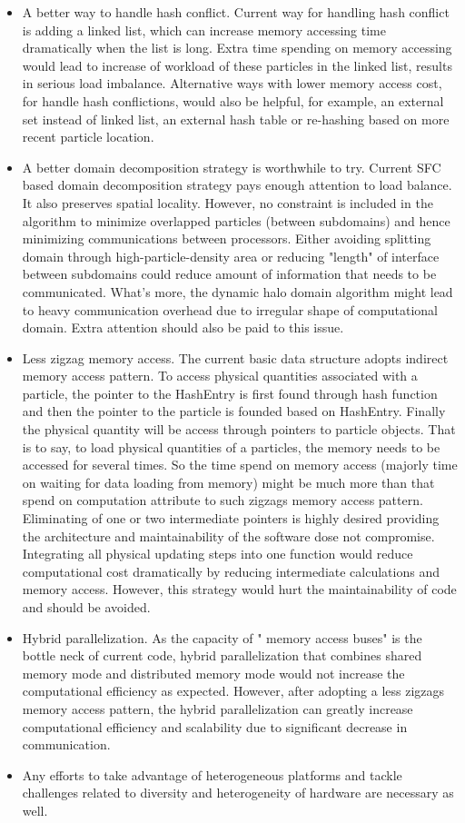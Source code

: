 \begin{itemize}
\item A better way to handle hash conflict. Current way for handling hash conflict is adding a linked list, which can increase memory accessing time dramatically when the list is long. Extra time spending on memory accessing would lead to increase of workload of these particles in the linked list, results in serious load imbalance. Alternative ways with lower memory access cost, for handle hash conflictions, would also be helpful, for example, an external set instead of linked list, an external hash table or re-hashing based on more recent particle location.
\item A better domain decomposition strategy is worthwhile to try. Current SFC based domain decomposition strategy pays enough attention to load balance. It also preserves spatial locality. However, no constraint is included in the algorithm to minimize overlapped particles (between subdomains) and hence minimizing communications between processors. Either avoiding splitting domain through high-particle-density area or reducing "length" of interface between subdomains could reduce amount of information that needs to be communicated. What's more, the dynamic halo domain algorithm might lead to heavy communication overhead due to irregular shape of computational domain. Extra attention should also be paid to this issue.
\item Less zigzag memory access. The current basic data structure adopts indirect memory access pattern. To access physical quantities associated with a particle, the pointer to the HashEntry is first found through hash function and then the pointer to the particle is founded based on HashEntry. Finally the physical quantity will be access through pointers to particle objects. That is to say, to load physical quantities of a particles, the memory needs to be accessed for several times.
So the time spend on memory access (majorly time on waiting for data loading from memory) might be much more than that spend on computation attribute to such zigzags memory access pattern. Eliminating of one or two intermediate pointers is highly desired providing the architecture and maintainability of the software dose not compromise. Integrating all physical updating steps into one function would reduce computational cost dramatically by reducing intermediate calculations and memory access. However, this strategy would hurt the maintainability of code and should be avoided.
\item Hybrid parallelization. As the capacity of " memory access buses" is the bottle neck of current code, hybrid parallelization that combines shared memory mode and distributed memory mode would not increase the computational efficiency as expected. However, after adopting a less zigzags memory access pattern, the hybrid parallelization can greatly increase computational efficiency and scalability due to significant decrease in communication.
\item Any efforts to take advantage of heterogeneous platforms and tackle challenges related to diversity and heterogeneity of hardware are necessary as well.
\end{itemize}


